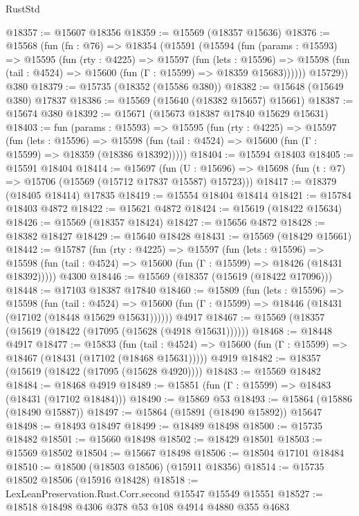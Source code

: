 \begin{lexlean}{RustStd}
\begin{coremodule}
{\begin{coremodule}
{{{{{{{{{{{{{{{{{{{{{{{{{{{{{{{{{{{{{{{{{{{{{{{{{{{{{{{{{{{{@18357 := @15607 @18356
@18359 := @15569 (@18357 @15636)
@18376 := @15568
    (fun (fn : @76) =>
    @18354
      (@15591
        (@15594
          (fun (params : @15593) =>
          @15595
            (fun (rty : @4225) =>
            @15597
              (fun (lets : @15596) =>
              @15598 (fun (tail : @4524) => @15600 (fun (Γ : @15599) => @18359 @15683))))))
        @15729))
    @380
@18379 := @15735 (@18352 (@15586 @380))
@18382 := @15648 (@15649 @380) @17837
@18386 := @15569 (@15640 (@18382 @15657) @15661)
@18387 := @15674 @380
@18392 := @15671 (@15673 @18387 @17840 @15629 @15631)
@18403 := fun (params : @15593) =>
  @15595
    (fun (rty : @4225) =>
    @15597
      (fun (lets : @15596) =>
      @15598 (fun (tail : @4524) => @15600 (fun (Γ : @15599) => @18359 (@18386 @18392)))))
@18404 := @15594 @18403
@18405 := @15591 @18404
@18414 := @15697
    (fun (U : @15696) => @15698 (fun (t : @7) => @15706 (@15569 (@15712 @17837 @15587) @15723)))
@18417 := @18379 (@18405 @18414) @17835
@18419 := @15554 @18404 @18414
@18421 := @15784 @18403 @4872
@18422 := @15621 @4872
@18424 := @15619 (@18422 @15634)
@18426 := @15569 (@18357 @18424)
@18427 := @15656 @4872
@18428 := @18382 @18427
@18429 := @15640 @18428
@18431 := @15569 (@18429 @15661)
@18442 := @15787
    (fun (rty : @4225) =>
    @15597
      (fun (lets : @15596) =>
      @15598 (fun (tail : @4524) => @15600 (fun (Γ : @15599) => @18426 (@18431 @18392)))))
    @4300
@18446 := @15569 (@18357 (@15619 (@18422 @17096)))
@18448 := @17103 @18387 @17840
@18460 := @15809
    (fun (lets : @15596) =>
    @15598
      (fun (tail : @4524) =>
      @15600 (fun (Γ : @15599) => @18446 (@18431 (@17102 (@18448 @15629 @15631))))))
    @4917
@18467 := @15569 (@18357 (@15619 (@18422 (@17095 (@15628 (@4918 @15631))))))
@18468 := @18448 @4917
@18477 := @15833
    (fun (tail : @4524) => @15600 (fun (Γ : @15599) => @18467 (@18431 (@17102 (@18468 @15631)))))
    @4919
@18482 := @18357 (@15619 (@18422 (@17095 (@15628 @4920))))
@18483 := @15569 @18482
@18484 := @18468 @4919
@18489 := @15851 (fun (Γ : @15599) => @18483 (@18431 (@17102 @18484)))
@18490 := @15869 @53
@18493 := @15864 (@15886 (@18490 @15887))
@18497 := @15864 (@15891 (@18490 @15892)) @15647
@18498 := @18493 @18497
@18499 := @18489 @18498
@18500 := @15735 @18482
@18501 := @15660 @18498
@18502 := @18429 @18501
@18503 := @15569 @18502
@18504 := @15667 @18498
@18506 := @18504 @17101 @18484
@18510 := @18500 (@18503 @18506) (@15911 @18356)
@18514 := @15735 @18502 @18506 (@15916 @18428)
@18518 := LexLeanPreservation.Rust.Corr.second @15547 @15549 @15551
@18527 := @18518 @18498 @4306 @378 @53 @108 @4914 @4880 @355 @4683
}}}}}}}}}}}}}}}}}}}}}}}}}}}}}}}}}}}}}}}}}}}}}}}}}}}}}}}}}}}}
\end{coremodule}}
\end{coremodule}
\end{lexlean}

